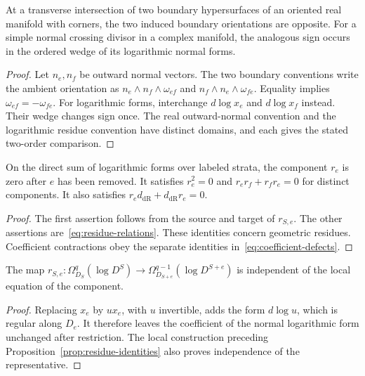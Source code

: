 \begin{lemma}
\label{lem:orientation}
At a transverse intersection of two boundary hypersurfaces of an oriented real manifold with corners,
the two induced boundary orientations are opposite.
For a simple normal crossing divisor in a complex manifold,
the analogous sign occurs in the ordered wedge of its logarithmic normal forms.
\end{lemma}
\begin{proof}
Let $n_e,n_f$ be outward normal vectors.
The two boundary conventions write the ambient orientation as
$n_e\wedge n_f\wedge\omega_{ef}$ and
$n_f\wedge n_e\wedge\omega_{fe}$.
Equality implies $\omega_{ef}=-\omega_{fe}$.
For logarithmic forms, interchange $d\log x_e$ and $d\log x_f$ instead.
Their wedge changes sign once.
The real outward-normal convention and the logarithmic residue convention
have distinct domains, and each gives the stated two-order comparison.
\end{proof}

\begin{lemma}
\label{lem:residue-properties}
On the direct sum of logarithmic forms over labeled strata,
the component $r_e$ is zero after $e$ has been removed.
It satisfies $r_e^2=0$ and $r_er_f+r_fr_e=0$ for distinct components.
It also satisfies $r_ed_{\mathrm{dR}}+d_{\mathrm{dR}}r_e=0$.
\end{lemma}
\begin{proof}
The first assertion follows from the source and target of $r_{S,e}$.
The other assertions are~\eqref{eq:residue-relations}.
These identities concern geometric residues.
Coefficient contractions obey the separate identities in~\eqref{eq:coefficient-defects}.
\end{proof}

\begin{lemma}
\label{lem:residue-well-defined}
The map
$r_{S,e}:\Omega^q_{D_S}(\log D^S)\to
\Omega^{q-1}_{D_{S+e}}(\log D^{S+e})$
is independent of the local equation of the component.
\end{lemma}
\begin{proof}
Replacing $x_e$ by $u x_e$, with $u$ invertible,
adds the form $d\log u$, which is regular along $D_e$.
It therefore leaves the coefficient of the normal logarithmic form unchanged after restriction.
The local construction preceding Proposition~\ref{prop:residue-identities}
also proves independence of the representative.
\end{proof}


